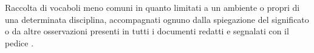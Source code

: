 Raccolta di vocaboli meno comuni in quanto limitati a un ambiente o propri di una determinata disciplina, 
accompagnati ognuno dalla spiegazione del significato o da altre osservazioni  presenti in tutti i documenti redatti e segnalati con il pedice .
